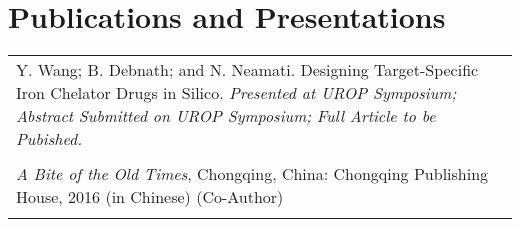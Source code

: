 \documentclass[letterpaper,10pt]{ctexart}
\begin{document}



\section{Publications and Presentations}
\begin{tabular}{p{14cm}}

Y. Wang; B. Debnath; and N. Neamati. Designing Target-Specific Iron Chelator Drugs in Silico. \emph{Presented at UROP Symposium; Abstract Submitted on UROP Symposium; Full Article to be Pubished.}\\\\

\emph{A Bite of the Old Times}, Chongqing, China: Chongqing Publishing House, 2016 (in Chinese) (Co-Author)\\\\


\end{tabular}



\end{document}
